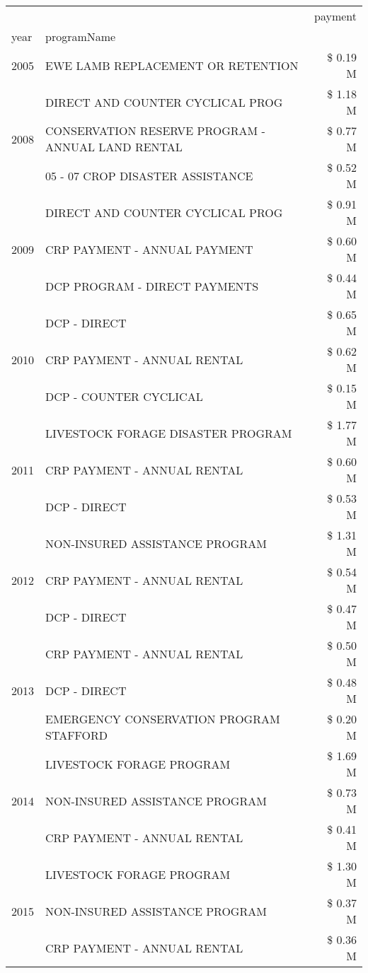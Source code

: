 \begin{tabular}{llr}
\toprule
 &  & payment \\
year & programName &  \\
\midrule
2005 & EWE LAMB REPLACEMENT OR RETENTION & \$ 0.19 M \\
\cline{1-3}
\multirow[t]{3}{*}{2008} & DIRECT AND COUNTER CYCLICAL PROG & \$ 1.18 M \\
 & CONSERVATION RESERVE PROGRAM - ANNUAL LAND RENTAL & \$ 0.77 M \\
 & 05 - 07 CROP DISASTER ASSISTANCE & \$ 0.52 M \\
\cline{1-3}
\multirow[t]{3}{*}{2009} & DIRECT AND COUNTER CYCLICAL PROG & \$ 0.91 M \\
 & CRP PAYMENT - ANNUAL PAYMENT & \$ 0.60 M \\
 & DCP PROGRAM - DIRECT PAYMENTS & \$ 0.44 M \\
\cline{1-3}
\multirow[t]{3}{*}{2010} & DCP - DIRECT & \$ 0.65 M \\
 & CRP PAYMENT - ANNUAL RENTAL & \$ 0.62 M \\
 & DCP - COUNTER CYCLICAL & \$ 0.15 M \\
\cline{1-3}
\multirow[t]{3}{*}{2011} & LIVESTOCK FORAGE DISASTER PROGRAM & \$ 1.77 M \\
 & CRP PAYMENT - ANNUAL RENTAL & \$ 0.60 M \\
 & DCP - DIRECT & \$ 0.53 M \\
\cline{1-3}
\multirow[t]{3}{*}{2012} & NON-INSURED ASSISTANCE PROGRAM & \$ 1.31 M \\
 & CRP PAYMENT - ANNUAL RENTAL & \$ 0.54 M \\
 & DCP - DIRECT & \$ 0.47 M \\
\cline{1-3}
\multirow[t]{3}{*}{2013} & CRP PAYMENT - ANNUAL RENTAL & \$ 0.50 M \\
 & DCP - DIRECT & \$ 0.48 M \\
 & EMERGENCY CONSERVATION PROGRAM STAFFORD & \$ 0.20 M \\
\cline{1-3}
\multirow[t]{3}{*}{2014} & LIVESTOCK FORAGE PROGRAM & \$ 1.69 M \\
 & NON-INSURED ASSISTANCE PROGRAM & \$ 0.73 M \\
 & CRP PAYMENT - ANNUAL RENTAL & \$ 0.41 M \\
\cline{1-3}
\multirow[t]{3}{*}{2015} & LIVESTOCK FORAGE PROGRAM & \$ 1.30 M \\
 & NON-INSURED ASSISTANCE PROGRAM & \$ 0.37 M \\
 & CRP PAYMENT - ANNUAL RENTAL & \$ 0.36 M \\

\end{tabular}
